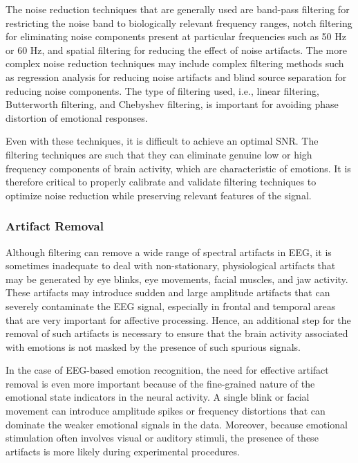 \documentclass{WileyMSP-template}
\begin{document}
The noise reduction techniques that are generally used are band-pass filtering for restricting the noise band to biologically relevant frequency ranges, notch filtering for eliminating noise components present at particular frequencies such as 50 Hz or 60 Hz, and spatial filtering for reducing the effect of noise artifacts. The more complex noise reduction techniques may include complex filtering methods such as regression analysis for reducing noise artifacts and blind source separation for reducing noise components. The type of filtering used, i.e., linear filtering, Butterworth filtering, and Chebyshev filtering, is important for avoiding phase distortion of emotional responses.

Even with these techniques, it is difficult to achieve an optimal SNR. The filtering techniques are such that they can eliminate genuine low or high frequency components of brain activity, which are characteristic of emotions. It is therefore critical to properly calibrate and validate filtering techniques to optimize noise reduction while preserving relevant features of the signal.

\subsubsection{Artifact Removal}

Although filtering can remove a wide range of spectral artifacts in EEG, it is sometimes inadequate to deal with non-stationary, physiological artifacts that may be generated by eye blinks, eye movements, facial muscles, and jaw activity. These artifacts may introduce sudden and large amplitude artifacts that can severely contaminate the EEG signal, especially in frontal and temporal areas that are very important for affective processing. Hence, an additional step for the removal of such artifacts is necessary to ensure that the brain activity associated with emotions is not masked by the presence of such spurious signals.

In the case of EEG-based emotion recognition, the need for effective artifact removal is even more important because of the fine-grained nature of the emotional state indicators in the neural activity. A single blink or facial movement can introduce amplitude spikes or frequency distortions that can dominate the weaker emotional signals in the data. Moreover, because emotional stimulation often involves visual or auditory stimuli, the presence of these artifacts is more likely during experimental procedures.
\end{document}

